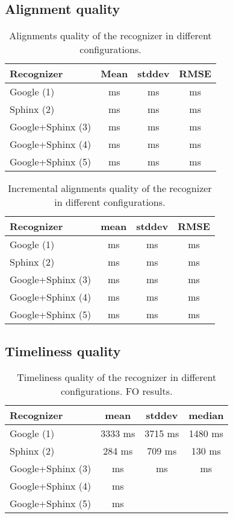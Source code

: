 \subsection {Alignment quality}
\begin {table}
\label{tab:alignment_non_increm} 
\begin{center}
\caption {Alignments quality of the recognizer in different configurations.}
    \begin{tabular}{l  c  c  c }
   \toprule
    Recognizer & Mean & stddev & RMSE \\ \toprule
    Google (1)  & ms & ms & ms \\ 
    Sphinx (2)  & ms & ms & ms \\ 
    Google+Sphinx (3)  & ms & ms & ms \\ 
    Google+Sphinx (4)  & ms & ms & ms \\ 
    Google+Sphinx (5)  & ms & ms & ms \\ \bottomrule  
    \end{tabular}
\end{center}
\end {table}
\begin {table}
\label{tab:alignment_incr} 
\begin{center}
\caption {Incremental alignments quality of the recognizer in different
configurations.}
    \begin{tabular}{ l  c  c  c }
    \toprule
    Recognizer & mean  & stddev & RMSE\\ \toprule
    Google (1)  & ms & ms & ms \\ 
    Sphinx (2)  & ms & ms & ms \\ 
    Google+Sphinx (3)  & ms & ms & ms \\ 
    Google+Sphinx (4)  & ms & ms & ms \\ 
    Google+Sphinx (5)  & ms & ms & ms \\ \bottomrule  
    \end{tabular}
\end{center}
\end {table}
\subsection {Timeliness quality}
\begin {table}
\label{tab:alignment_incr} 
\begin{center}
\caption {Timeliness quality of the recognizer in different configurations. FO
results.}
    \begin{tabular}{ l  c  c  c }
    \toprule
    Recognizer & mean & stddev & median \\ \toprule
    Google (1)  & 3333 ms & 3715 ms &  1480 ms\\
    Sphinx (2)  &284 ms & 709 ms & 130 ms \\
    Google+Sphinx (3)  & ms & ms & ms \\ 
    Google+Sphinx (4)  & ms & & \\ 
    Google+Sphinx (5)  & ms & &  \\ \bottomrule  
    \end{tabular}
\end{center}
\end {table}


